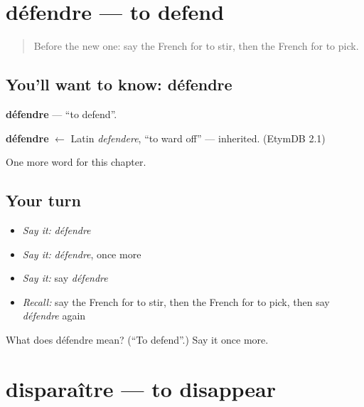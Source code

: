 \section[défendre]{défendre — to defend}

\label{lesson:FR-C184-defendre}



\begin{quote}
Before the new one: say the French for to stir, then the French for to pick.
\end{quote}

\subsection*{You'll want to know: défendre}
\textbf{défendre} — \textquotedblleft{}to defend\textquotedblright{}.

\begin{cousinweb}
\textbf{défendre} $\leftarrow$ Latin \emph{defendere}, \textquotedblleft{}to ward off\textquotedblright{} — inherited. (EtymDB 2.1)
\end{cousinweb}

\begin{grammarlens}[title={What you've built}]
One more word for this chapter.
\end{grammarlens}

\subsection*{Your turn}
\begin{itemize}
\raggedright
  \item \emph{Say it:} \emph{défendre}
  \item \emph{Say it:} \emph{défendre}, once more
  \item \emph{Say it:} say \emph{défendre}
  \item \emph{Recall:} say the French for to stir, then the French for to pick, then say \emph{défendre} again
\end{itemize}

\begin{tcolorbox}[breakable,colback=teal!4,colframe=teal!35!black,title={Before you move on}]
What does défendre mean? (\textquotedblleft{}To defend\textquotedblright{}.) Say it once more.
\end{tcolorbox}
\section[disparaître]{disparaître — to disappear}

